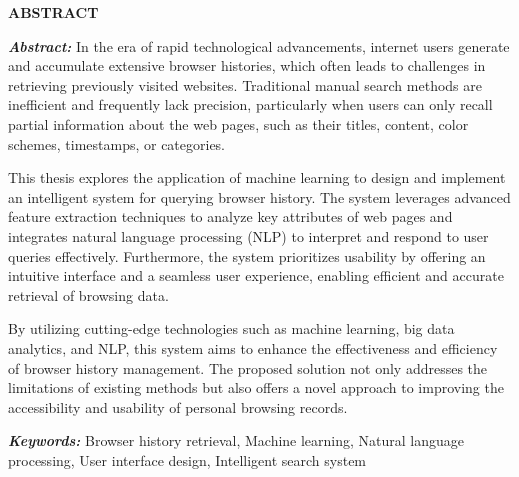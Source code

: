 
\begin{center}
    \textbf{\large ABSTRACT}
\end{center}
\changefontsizes[16pt]{12pt}

\textit{\textbf{Abstract:}} In the era of rapid technological advancements, internet users generate and accumulate extensive browser histories, which often leads to challenges in retrieving previously visited websites. Traditional manual search methods are inefficient and frequently lack precision, particularly when users can only recall partial information about the web pages, such as their titles, content, color schemes, timestamps, or categories.

This thesis explores the application of machine learning to design and implement an intelligent system for querying browser history. The system leverages advanced feature extraction techniques to analyze key attributes of web pages and integrates natural language processing (NLP) to interpret and respond to user queries effectively. Furthermore, the system prioritizes usability by offering an intuitive interface and a seamless user experience, enabling efficient and accurate retrieval of browsing data.

By utilizing cutting-edge technologies such as machine learning, big data analytics, and NLP, this system aims to enhance the effectiveness and efficiency of browser history management. The proposed solution not only addresses the limitations of existing methods but also offers a novel approach to improving the accessibility and usability of personal browsing records.

\vspace{-0.5cm}
\begin{flushleft}
  \textit{\textbf{Keywords:}} Browser history retrieval, Machine learning, Natural language processing, User interface design, Intelligent search system
\end{flushleft}

\newpage
